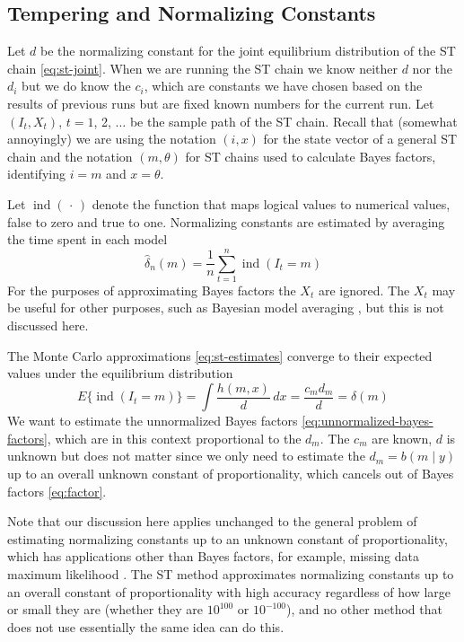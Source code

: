 \documentclass[11pt]{article}
\DeclareMathOperator{\indicator}{ind}
\newcommand{\fatdot}{\,\cdot\,}
\begin{document}
\subsection{Tempering and Normalizing Constants}

Let $d$ be the normalizing constant for the joint equilibrium distribution
of the ST chain \eqref{eq:st-joint}.  When we are running the ST chain we know
neither $d$ nor the $d_i$ but we do know the $c_i$, which are constants we
have chosen based on the results of previous runs but are fixed known numbers
for the current run.  Let $(I_t, X_t)$, $t = 1$, 2, $\ldots$ be the sample
path of the ST chain.  Recall that (somewhat annoyingly) we are using the
notation $(i, x)$ for the state vector of a general ST chain and the notation
$(m, \theta)$ for ST chains used to calculate Bayes factors, identifying
$i = m$ and $x = \theta$.

Let $\indicator(\fatdot)$ denote the function that maps logical values to
numerical values, false to zero and true to one.  Normalizing constants are
estimated by averaging the time spent in each model
\begin{equation} \label{eq:st-estimates}
   \hat{\delta}_n(m) = \frac{1}{n} \sum_{t = 1}^n \indicator(I_t = m)
\end{equation}
For the purposes of approximating Bayes factors the $X_t$ are ignored.
The $X_t$ may be useful for other purposes, such as
Bayesian model averaging \citep*{bma}, but this is not discussed here.

The Monte Carlo approximations \eqref{eq:st-estimates} converge
to their expected values under the equilibrium distribution
\begin{equation} \label{eq:st-expectations}
   E\{ \indicator(I_t = m) \}
   =
   \int \frac{h(m, x)}{d} \, d x
   =
   \frac{c_m d_m}{d}
   =
   \delta(m)
\end{equation}
We want to estimate the unnormalized Bayes factors
\eqref{eq:unnormalized-bayes-factors}, which are in this context proportional
to the $d_m$.  The $c_m$ are known, $d$ is unknown but does not matter since
we only need to estimate the $d_m = b(m \mid y)$ up to an overall unknown
constant of proportionality, which cancels out of Bayes factors
\eqref{eq:factor}.

Note that our discussion here applies unchanged to the general problem of
estimating normalizing constants up to an unknown constant of proportionality,
which has applications other than Bayes factors, for example, missing data
maximum likelihood \citep{thompson-guo,geyer,sung-geyer}.
The ST method approximates normalizing constants up to an overall constant of
proportionality with high accuracy regardless of how large or small they are
(whether they are $10^{100}$ or $10^{-100}$), and no other method that does
not use essentially the same idea can do this.
\end{document}
